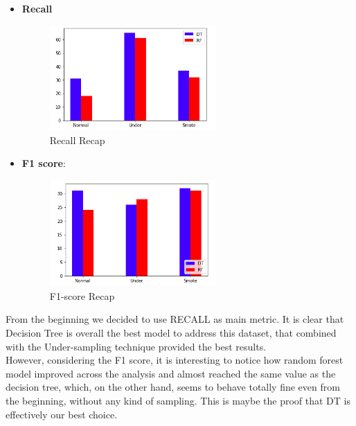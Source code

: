 \begin{itemize}
\item \textbf{Recall} 

\begin{figure}[H]
\centering
\includegraphics[width=0.6\textwidth]{Img/recall_recap.png}
\caption{Recall Recap}
\end{figure}
\item \textbf{F1 score}: 

\begin{figure}[H]
\centering
\includegraphics[width=0.6\textwidth]{Img/recap_f1.png}
\caption{F1-score Recap}
\end{figure}
\end{itemize}

\noindent From the beginning we decided to use RECALL as main metric. It is clear that Decision Tree is overall the best model to address this dataset, that combined with the Under-sampling technique provided the best results.\\
However, considering the F1 score, it is interesting to notice how random forest model improved across the analysis and almost reached the same value as the decision tree, which, on the other hand, seems to behave totally fine even from the beginning, without any kind of sampling. This is maybe the proof that DT is effectively our best choice.